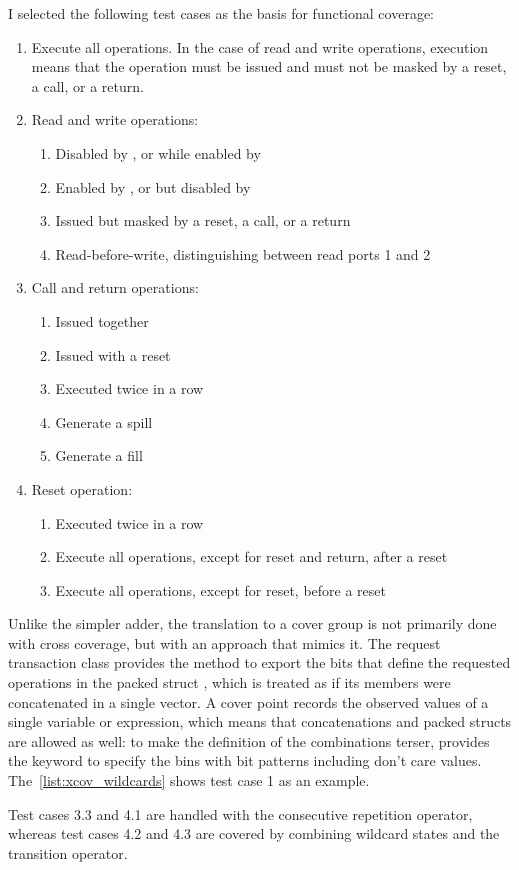 \noindent I selected the following test cases as the basis for functional coverage:
\begin{enumerate}
    \item Execute all operations. In the case of read and write operations, execution means that the operation must be issued and must not be masked by a reset, a call, or a return.
    \item Read and write operations:
    \begin{enumerate}[label*=\arabic*.]
         \item Disabled by ,  or  while enabled by 
         \item Enabled by ,  or  but disabled by 
         \item Issued but masked by a reset, a call, or a return
         \item Read-before-write, distinguishing between read ports 1 and 2
    \end{enumerate}
    \item Call and return operations:
    \begin{enumerate}[label*=\arabic*.]
         \item Issued together
         \item Issued with a reset
         \item Executed twice in a row
         \item Generate a spill
         \item Generate a fill
    \end{enumerate}
    \item Reset operation:
    \begin{enumerate}[label*=\arabic*.]
         \item Executed twice in a row
         \item Execute all operations, except for reset and return, after a reset
         \item Execute all operations, except for reset, before a reset
    \end{enumerate}
\end{enumerate}

Unlike the simpler adder, the translation to a \sv cover group is not primarily done with cross coverage, but with an approach that mimics it. The request transaction class  provides the method  to export the bits that define the requested operations in the packed struct , which is treated as if its members were concatenated in a single vector.
A cover point records the observed values of a single variable or expression, which means that concatenations and packed structs are allowed as well: to make the definition of the combinations terser, \sv provides the  keyword to specify the bins with bit patterns including don't care values. The~\cref{list:xcov_wildcards} shows test case 1 as an example.

Test cases 3.3 and 4.1 are handled with the consecutive repetition operator, whereas test cases 4.2 and 4.3 are covered by combining wildcard states and the transition operator.